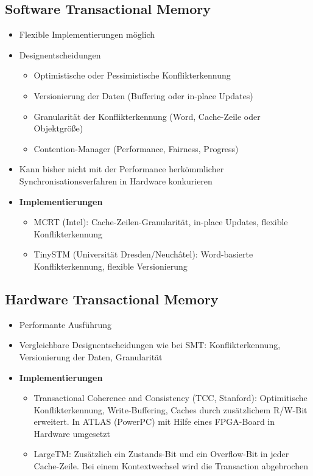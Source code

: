 \subsection{Software Transactional Memory}
\begin{itemize}
	\item Flexible Implementierungen möglich
	\item Designentscheidungen
	\begin{itemize}
		\item Optimistische oder Pessimistische Konflikterkennung
		\item Versionierung der Daten (Buffering oder in-place Updates)
		\item Granularität der Konflikterkennung (Word, Cache-Zeile oder Objektgröße)
		\item Contention-Manager (Performance, Fairness, Progress)
	\end{itemize}
	\item Kann bisher nicht mit der Performance herkömmlicher Synchronisationsverfahren in Hardware konkurieren
	\item \textbf{Implementierungen}
	\begin{itemize}
		\item MCRT (Intel): Cache-Zeilen-Granularität, in-place Updates, flexible Konflikterkennung
		\item TinySTM (Universität Dresden/Neuchâtel): Word-basierte Konflikterkennung, flexible Versionierung
	\end{itemize}
\end{itemize}


\subsection{Hardware Transactional Memory}
\begin{itemize}
	\item Performante Ausführung
	\item Vergleichbare Designentscheidungen wie bei SMT: Konflikterkennung, Versionierung der Daten, Granularität
	\item \textbf{Implementierungen}
	\begin{itemize}
		\item Transactional Coherence and Consistency (TCC, Stanford): Optimitische Konflikterkennung, Write-Buffering, Caches durch zusätzlichem R/W-Bit erweitert. In ATLAS (PowerPC) mit Hilfe eines FPGA-Board in Hardware umgesetzt
		\item LargeTM: Zusätzlich ein Zustands-Bit und ein Overflow-Bit in jeder Cache-Zeile. Bei einem Kontextwechsel wird die Transaction abgebrochen
	\end{itemize}
\end{itemize}


